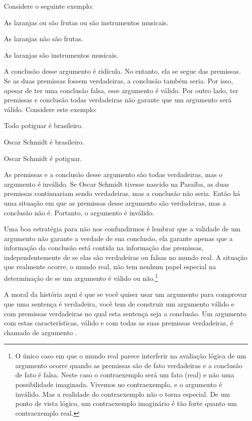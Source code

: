Considere o seguinte exemplo:
	\begin{earg}
		\item[] As laranjas ou são frutas ou são instrumentos musicais.
		\item[] As laranjas não são frutas.
		\item[\therefore] As laranjas são instrumentos musicais.
	\end{earg}
A conclusão desse argumento é ridícula. No entanto, ela se segue das premissas.
Se as duas premissas fossem verdadeiras, a conclusão também seria.
Por isso, apesar de ter uma conclusão falsa, esse argumento é válido.
Por outro lado, ter premissas e conclusão todas verdadeiras não garante que um argumento será válido.
Considere este exemplo:
	\begin{earg}
		\item[] Todo potiguar é brasileiro.
		\item[] Oscar Schmidt é brasileiro.
		\item[\therefore] Oscar Schmidt é potiguar.
	\end{earg}
As premissas e a conclusão desse argumento são todas verdadeiras, mas o argumento é inválido.
Se Oscar Schmidt tivesse nascido na Paraíba, as duas premissas continuariam sendo verdadeiras, mas a conclusão não seria.
Então há uma situação em que as premissas desse argumento são verdadeiras, mas a conclusão não é.
Portanto, o argumento é inválido.

Uma boa estratégia para não nos confundirmos é lembrar que a validade de um argumento não garante a verdade de sua conclusão, ela garante apenas que a informação da conclusão está contida na informação das premissas, independentemente de se elas são verdadeiras ou falsas no mundo real.
A situação que realmente ocorre, o mundo real, não tem nenhum papel especial na determinação de se um argumento é válido ou não.\footnote{
	O único caso em que o mundo real parece interferir na avaliação lógica de um argumento ocorre quando as premissas são de fato verdadeiras e a conclusão de fato é falsa.
	Neste caso o contraexemplo será um fato (real) e não uma possibilidade imaginada.
	Vivemos no contraexemplo, e o argumento é inválido.
	Mas a realidade do contraexemplo não o torna especial.
	De um ponto de vista lógico, um contraexemplo imaginário é tão forte quanto um contraexemplo real.}

A moral da história aqui é que se você quiser usar um argumento para comprovar que uma sentença é verdadeira, você tem de construir um argumento válido e com premissas verdadeiras no qual esta sentença seja a conclusão.
Um argumento com estas características, válido e com todas as suas premissas verdadeiras, é chamado de argumento .


